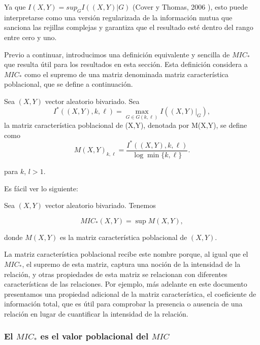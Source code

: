         Ya que $I(X,Y) = sup_G I((X,Y)|G)$ (Cover y Thomas, 2006 \cite[Cap. 8]{CoverThomas2006}), esto puede interpretarse como una versi\'on regularizada de la informaci\'on mutua que sanciona las rejillas complejas y garantiza que el resultado est\'e dentro del rango entre cero y uno.
        
        Previo a continuar, introducimos una definici\'on equivalente y sencilla de $MIC_*$ que resulta \'util para los resultados en esta secci\'on. Esta definici\'on considera a $MIC_*$ como el supremo de una matriz denominada matriz caracter\'istica poblacional, que se define a continuaci\'on.
        
        \begin{defn}
            Sea $(X,Y)$ vector aleatorio bivariado. Sea
            $$
            I^*((X, Y), k, \ell)=\max _{G \in G(k, \ell)} I\left(\left.(X, Y)\right|_G\right),
            $$
            la matriz caracter\'istica poblacional de (X,Y), denotada por M(X,Y), se define como
            $$
            M(X, Y)_{k, \ell}=\frac{I^*((X, Y), k, \ell)}{\log \min \{k, \ell\}}.
            $$
        \end{defn}
        
        para $k$, $l > 1$.
        
        Es f\'acil ver lo siguiente:
    
        \begin{prop}
            Sea $(X,Y)$ vector aleatorio bivariado. Tenemos
        
        $$MIC_*(X,Y) = \sup M(X,Y),$$
        
        donde $M(X,Y)$ es la matriz caracter\'istica poblacional de $(X,Y)$.
        \end{prop}	
    
        
        La matriz caracter\'istica poblacional recibe este nombre porque, al igual que el $MIC_*$, el supremo de esta matriz, captura una noci\'on de la intensidad de la relaci\'on, y otras propiedades de esta matriz se relacionan con diferentes caracter\'isticas de las relaciones. Por ejemplo, m\'as adelante en este documento presentamos una propiedad adicional de la matriz caracter\'istica, el coeficiente de informaci\'on total, que es \'util para comprobar la presencia o ausencia de una relaci\'on en lugar de cuantificar la intensidad de la relaci\'on.
    
        \subsubsection[]{El $MIC_*$ es el valor poblacional del $MIC$}
    
